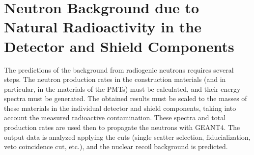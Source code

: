 \section{Neutron Background due to Natural Radioactivity in the Detector and Shield Components}
\label{secNRalphaN}

The predictions of the background from radiogenic neutrons requires several steps. The neutron production rates in the construction materials (and in particular, in the materials of the PMTs) must be calculated, and their energy spectra must be generated. The obtained results must be scaled to the masses of these materials in the individual detector and shield components, taking into account the measured radioactive contamination.   These spectra and total production rates are used then to propagate the neutrons with GEANT4. The output data is analyzed applying the cuts (single scatter selection, fiducialization, veto coincidence cut, etc.), and the nuclear recoil background is predicted. 

